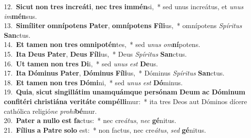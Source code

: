 {12.~}\textbf{Si}\textbf{cut} \textbf{non} \textbf{tres} \textbf{in}\textbf{cre}\textbf{á}\textbf{ti}, \textbf{nec} \textbf{tres} \textbf{im}\textbf{mén}si,~* sed unus increátus, et \textit{u}\textit{nus} \textit{im}\textbf{mén}sus.\\
{13.~}\textbf{Si}\textbf{mí}\textbf{li}\textbf{ter} \textbf{om}\textbf{ní}\textbf{po}\textbf{tens} \textbf{Pa}\textbf{ter}, \textbf{om}\textbf{ní}\textbf{po}\textbf{tens} \textbf{Fí}\textbf{li}us,~* omnípotens \textit{Spí}\textit{ri}\textit{tus} \textbf{San}ctus.\\
{14.~}\textbf{Et} \textbf{ta}\textbf{men} \textbf{non} \textbf{tres} \textbf{om}\textbf{ni}\textbf{po}\textbf{tén}tes,~* sed \textit{u}\textit{nus} \textit{om}\textbf{ní}potens.\\
{15.~}\textbf{I}\textbf{ta} \textbf{De}\textbf{us} \textbf{Pa}\textbf{ter}, \textbf{De}\textbf{us} \textbf{Fí}\textbf{li}us,~* Deus \textit{Spí}\textit{ri}\textit{tus} \textbf{San}ctus.\\
{16.~}\textbf{Ut} \textbf{ta}\textbf{men} \textbf{non} \textbf{tres} \textbf{Di}i,~* sed \textit{u}\textit{nus} \textit{est} \textbf{De}us.\\
{17.~}\textbf{I}\textbf{ta} \textbf{Dó}\textbf{mi}\textbf{nus} \textbf{Pa}\textbf{ter}, \textbf{Dó}\textbf{mi}\textbf{nus} \textbf{Fí}\textbf{li}us,~* Dóminus \textit{Spí}\textit{ri}\textit{tus} \textbf{San}ctus.\\
{18.~}\textbf{Et} \textbf{ta}\textbf{men} \textbf{non} \textbf{tres} \textbf{Dó}\textbf{mi}ni,~* sed \textit{u}\textit{nus} \textit{est} \textbf{Dó}minus.\\
{19.~}\textbf{Qui}\textbf{a}, \textbf{si}\textbf{cut} \textbf{sin}\textbf{gil}\textbf{lá}\textbf{tim} \textbf{u}\textbf{nam}\textbf{quám}\textbf{que} \textbf{per}\textbf{só}\textbf{nam} \textbf{De}\textbf{um} \textbf{ac} \textbf{Dó}\textbf{mi}\textbf{num} \textbf{con}\textbf{fi}\textbf{té}\textbf{ri} \textbf{chri}\textbf{sti}\textbf{á}\textbf{na} \textbf{ve}\textbf{ri}\textbf{tá}\textbf{te} \textbf{com}\textbf{pél}\textbf{li}mur:~* ita tres Deos aut Dóminos dícere cathólica religió\textit{ne} \textit{pro}\textit{hi}\textbf{bé}mur.\\
{20.~}\textbf{Pa}\textbf{ter} \textbf{a} \textbf{nul}\textbf{lo} \textbf{est} \textbf{fa}ctus:~* nec cre\textit{á}\textit{tus}, \textit{nec} \textbf{gé}nitus.\\
{21.~}\textbf{Fí}\textbf{li}\textbf{us} \textbf{a} \textbf{Pa}\textbf{tre} \textbf{so}\textbf{lo} est:~* non factus, nec cre\textit{á}\textit{tus}, \textit{sed} \textbf{gé}nitus.\\
